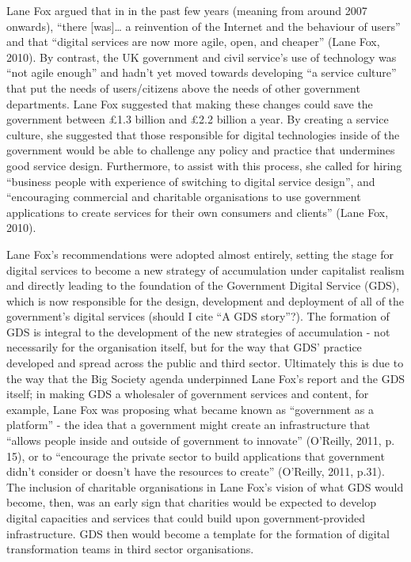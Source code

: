 Lane Fox argued that in in the past few years (meaning from around 2007
onwards), ``there {[}was{]}\ldots{} a reinvention of the Internet and
the behaviour of users'' and that ``digital services are now more agile,
open, and cheaper'' (Lane Fox, 2010). By contrast, the UK government and
civil service's use of technology was ``not agile enough'' and hadn't
yet moved towards developing ``a service culture'' that put the needs of
users/citizens above the needs of other government departments. Lane Fox
suggested that making these changes could save the government between
£1.3 billion and £2.2 billion a year. By creating a service culture, she
suggested that those responsible for digital technologies inside of the
government would be able to challenge any policy and practice that
undermines good service design. Furthermore, to assist with this
process, she called for hiring ``business people with experience of
switching to digital service design'', and ``encouraging commercial and
charitable organisations to use government applications to create
services for their own consumers and clients'' (Lane Fox, 2010).

Lane Fox's recommendations were adopted almost entirely, setting the
stage for digital services to become a new strategy of accumulation
under capitalist realism and directly leading to the foundation of the
Government Digital Service (GDS), which is now responsible for the
design, development and deployment of all of the government's digital
services (should I cite ``A GDS story''?). The formation of GDS is
integral to the development of the new strategies of accumulation - not
necessarily for the organisation itself, but for the way that GDS'
practice developed and spread across the public and third sector.
Ultimately this is due to the way that the Big Society agenda
underpinned Lane Fox's report and the GDS itself; in making GDS a
wholesaler of government services and content, for example, Lane Fox was
proposing what became known as ``government as a platform'' - the idea
that a government might create an infrastructure that ``allows people
inside and outside of government to innovate'' (O'Reilly, 2011, p. 15),
or to ``encourage the private sector to build applications that
government didn't consider or doesn't have the resources to create''
(O'Reilly, 2011, p.31). The inclusion of charitable organisations in
Lane Fox's vision of what GDS would become, then, was an early sign that
charities would be expected to develop digital capacities and services
that could build upon government-provided infrastructure. GDS then would
become a template for the formation of digital transformation teams in
third sector organisations.

